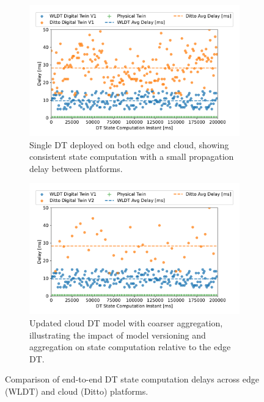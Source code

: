 \begin{figure}[ht!]
    \centering
    \begin{subfigure}{0.49\textwidth}
        \includegraphics[width=\textwidth]{figures/dtc/wldt_ditto_end_to_end_delay_comparison.pdf}
        \caption{Single DT deployed on both edge and cloud, showing consistent state computation with a small propagation delay between platforms.}
    \end{subfigure}\hfill
    \begin{subfigure}{0.49\textwidth}
        \includegraphics[width=\textwidth]{figures/dtc/wldt_ditto_end_to_end_delay_comparison_2_dts.pdf}
        \caption{Updated cloud DT model with coarser aggregation, illustrating the impact of model versioning and aggregation on state computation relative to the edge DT.}
    \end{subfigure}
    \caption{Comparison of end-to-end DT state computation delays across edge (WLDT) and cloud (Ditto) platforms.}
    \label{fig:exp_single_dt}
\end{figure}

